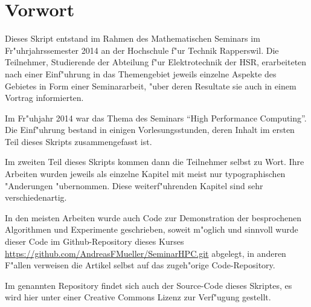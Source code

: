 \chapter*{Vorwort}
Dieses Skript entstand im Rahmen des Mathematischen Seminars
im Fr"uhrjahrssemester 2014 an der Hochschule f"ur Technik Rapperswil.
Die Teilnehmer, Studierende der Abteilung f"ur Elektrotechnik der
HSR, erarbeiteten nach einer Einf"uhrung in das Themengebiet jeweils
einzelne Aspekte des Gebietes in Form einer Seminararbeit, "uber
deren Resultate sie auch in einem Vortrag informierten. 

Im Fr"uhjahr 2014 war das Thema des Seminars ``High Performance Computing''.
Die Einf"uhrung bestand in einigen Vorlesungsstunden, deren
Inhalt im ersten Teil dieses Skripts zusammengefasst ist.

Im zweiten Teil dieses Skripts kommen dann die Teilnehmer
selbst zu Wort. Ihre Arbeiten wurden jeweils als einzelne
Kapitel mit meist nur typographischen "Anderungen "ubernommen.
Diese weiterf"uhrenden Kapitel sind sehr verschiedenartig.

In den meisten Arbeiten wurde auch Code zur Demonstration der 
besprochenen Algorithmen und Experimente geschrieben, soweit
m"oglich und sinnvoll wurde dieser Code im Github-Repository
dieses Kurses \url{https://github.com/AndreasFMueller/SeminarHPC.git}
abgelegt, in anderen F"allen verweisen die Artikel selbst auf
das zugeh"orige Code-Repository.

Im genannten Repository findet sich auch der Source-Code dieses
Skriptes, es wird hier unter einer Creative Commons Lizenz
zur Verf"ugung gestellt.
